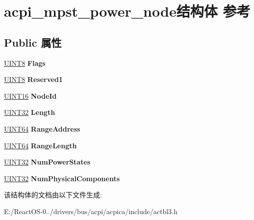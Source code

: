 \hypertarget{structacpi__mpst__power__node}{}\section{acpi\+\_\+mpst\+\_\+power\+\_\+node结构体 参考}
\label{structacpi__mpst__power__node}
\subsection*{Public 属性}
\begin{DoxyCompactItemize}
\item 
\mbox{\label{structacpi__mpst__power__node_ad9830e307169c0676d846d2c0c3f5030}} 
\hyperlink{_processor_bind_8h_ab27e9918b538ce9d8ca692479b375b6a}{U\+I\+N\+T8} {\bfseries Flags}
\item 
\mbox{\label{structacpi__mpst__power__node_ae20b619ee9f8feeb0c05010d101e5f23}} 
\hyperlink{_processor_bind_8h_ab27e9918b538ce9d8ca692479b375b6a}{U\+I\+N\+T8} {\bfseries Reserved1}
\item 
\mbox{\label{structacpi__mpst__power__node_a6b4d39ef9c17a3b2aabced54f72d249d}} 
\hyperlink{_processor_bind_8h_a09f1a1fb2293e33483cc8d44aefb1eb1}{U\+I\+N\+T16} {\bfseries Node\+Id}
\item 
\mbox{\label{structacpi__mpst__power__node_a402f4a85b2ea469bfe2fb723cdcdaa07}} 
\hyperlink{_processor_bind_8h_ae1e6edbbc26d6fbc71a90190d0266018}{U\+I\+N\+T32} {\bfseries Length}
\item 
\mbox{\label{structacpi__mpst__power__node_a05d2c17d5bf56a6952ab5faabeb4c64e}} 
\hyperlink{_processor_bind_8h_a57be03562867144161c1bfee95ca8f7c}{U\+I\+N\+T64} {\bfseries Range\+Address}
\item 
\mbox{\label{structacpi__mpst__power__node_acbfe292549c40e7eb0dd8310dfb49102}} 
\hyperlink{_processor_bind_8h_a57be03562867144161c1bfee95ca8f7c}{U\+I\+N\+T64} {\bfseries Range\+Length}
\item 
\mbox{\label{structacpi__mpst__power__node_adcaaa0d56a7de2a23a7270c3e773d482}} 
\hyperlink{_processor_bind_8h_ae1e6edbbc26d6fbc71a90190d0266018}{U\+I\+N\+T32} {\bfseries Num\+Power\+States}
\item 
\mbox{\label{structacpi__mpst__power__node_ad6e7057c24d3e6a770758f93d01a8c99}} 
\hyperlink{_processor_bind_8h_ae1e6edbbc26d6fbc71a90190d0266018}{U\+I\+N\+T32} {\bfseries Num\+Physical\+Components}
\end{DoxyCompactItemize}


该结构体的文档由以下文件生成\+:\begin{DoxyCompactItemize}
\item 
E\+:/\+React\+O\+S-\/0../drivers/bus/acpi/acpica/include/actbl3.\+h\end{DoxyCompactItemize}
